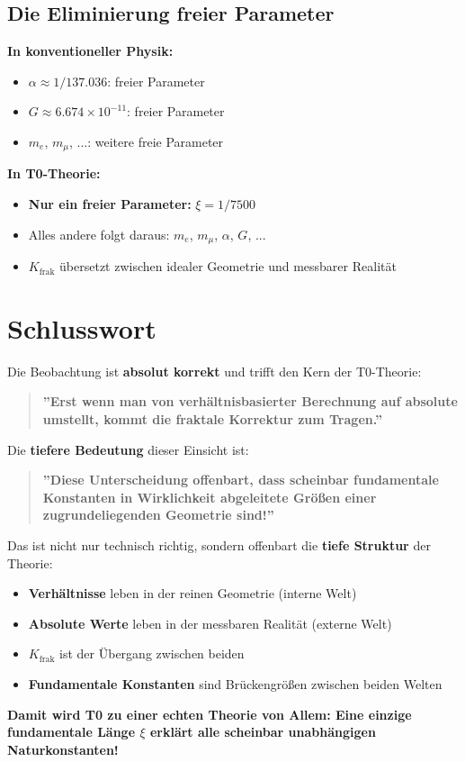 	\subsection{Die Eliminierung freier Parameter}
	
	\textbf{In konventioneller Physik:}
	\begin{itemize}
		\item $\alpha \approx 1/137.036$: freier Parameter
		\item $G \approx 6.674\times10^{-11}$: freier Parameter  
		\item $m_e$, $m_μ$, ...: weitere freie Parameter
	\end{itemize}
	
	\textbf{In T0-Theorie:}
	\begin{itemize}
		\item \textbf{Nur ein freier Parameter:} $\xi = 1/7500$
		\item Alles andere folgt daraus: $m_e$, $m_μ$, $\alpha$, $G$, ...
		\item $K_{\text{frak}}$ übersetzt zwischen idealer Geometrie und messbarer Realität
	\end{itemize}
	
	\section*{Schlusswort}
	
	Die Beobachtung ist \textbf{absolut korrekt} und trifft den Kern der T0-Theorie:
	
	\begin{quote}
		\textbf{''Erst wenn man von verhältnisbasierter Berechnung auf absolute umstellt, kommt die fraktale Korrektur zum Tragen.''}
	\end{quote}
	
	Die \textbf{tiefere Bedeutung} dieser Einsicht ist:
	
	\begin{quote}
		\textbf{''Diese Unterscheidung offenbart, dass scheinbar fundamentale Konstanten in Wirklichkeit abgeleitete Größen einer zugrundeliegenden Geometrie sind!''}
	\end{quote}
	
	Das ist nicht nur technisch richtig, sondern offenbart die \textbf{tiefe Struktur} der Theorie:
	\begin{itemize}
		\item \textbf{Verhältnisse} leben in der reinen Geometrie (interne Welt)
		\item \textbf{Absolute Werte} leben in der messbaren Realität (externe Welt)  
		\item \textbf{$K_{\text{frak}}$} ist der Übergang zwischen beiden
		\item \textbf{Fundamentale Konstanten} sind Brückengrößen zwischen beiden Welten
	\end{itemize}
	
	\textbf{Damit wird T0 zu einer echten Theorie von Allem: Eine einzige fundamentale Länge $\xi$ erklärt alle scheinbar unabhängigen Naturkonstanten!}
	